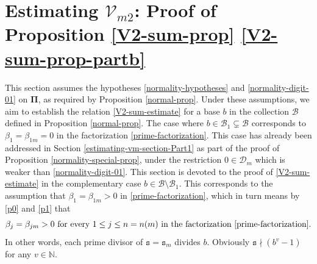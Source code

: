\documentclass[12pt, twoside]{article}
\theoremstyle{definition}
\numberwithin{equation}{section}
\begin{document}
  


\section{Estimating $\mathcal V_{m2}$: Proof of Proposition \ref{V2-sum-prop} \eqref{V2-sum-prop-partb}} \label{estimating-vm-section-Part2}
This section assumes the hypotheses \eqref{normality-hypotheses} and \eqref{normality-digit-01} on $\pmb{\Pi}$, as required by Proposition \ref{normal-prop}. 
Under these assumptions, we aim to establish the relation \eqref{V2-sum-estimate} for a base $b$ in the collection $\mathscr{B}$ defined in Proposition \ref{normal-prop}. The case where $b \in \mathscr{B}_1 \subsetneq \mathscr{B}$ corresponds to $\beta_1= \beta_{1m} = 0$ in the factorization \eqref{prime-factorization}. This case has already been addressed in Section \ref{estimating-vm-section-Part1} as part of the proof of Proposition \ref{normality-special-prop}, under the restriction $0\in \mathscr{D}_m$ which is weaker than \eqref{normality-digit-01}. This section is devoted to the proof of \eqref{V2-sum-estimate} in the complementary case $b \in \mathscr{B} \setminus \mathscr{B}_1$. This corresponds to the assumption that $\beta_{1} = \beta_{1m}> 0$ in \eqref{prime-factorization}, which in turn means by \eqref{p0} and \eqref{p1} that
\begin{equation} \label{beta1-nonzero} 
\beta_{j} = \beta_{jm}> 0 \text{ for every $1 \leq j \leq n = n(m)$ in the factorization \eqref{prime-factorization}.} 
\end{equation} 
In other words, each prime divisor of $\mathtt s = \mathtt s_m$ divides $b$. Obviously $\mathtt s \nmid (b^v-1)$ for any $v\in\mathbb{N}$. 
\end{document}
